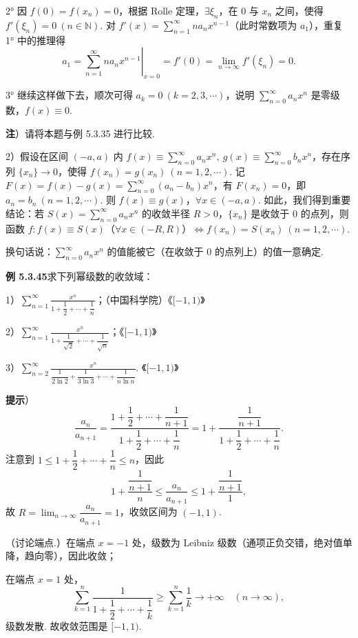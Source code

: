 \documentclass[UTF8,12pt,a4paper,fontset=fandol]{ctexart}
\begin{document}
2° 因 $f(0)=f(x_n)=0$，根据 Rolle 定理，$\exists\xi_n$，在 0 与 $x_n$ 之间，使得 $f'(\xi_n)=0\ (n\in\mathbb N)$. 对 $f'(x)=\displaystyle\sum_{n=1}^{\infty}na_nx^{n-1}$（此时常数项为 $a_1$），重复 1° 中的推理得
\[
  a_1=\left.\sum_{n=1}^{\infty}na_nx^{n-1}\right|_{x=0}
  =f'(0)=\lim_{n\to\infty}f'(\xi_n)=0.
\]

3° 继续这样做下去，顺次可得 $a_k=0\ (k=2,3,\cdots)$，说明 $\displaystyle\sum_{n=0}^{\infty}a_nx^n$ 是零级数，$f(x)\equiv0$.

\noindent\textbf{注}）请将本题与例 5.3.35 进行比较.

2）假设在区间 $(-a,a)$ 内 $f(x)\equiv\displaystyle\sum_{n=0}^{\infty}a_nx^n,\ g(x)\equiv\displaystyle\sum_{n=0}^{\infty}b_nx^n$，存在序列 $\{x_n\}\to0$，使得 $f(x_n)=g(x_n)\ (n=1,2,\cdots)$. 记 $F(x)=f(x)-g(x)=\displaystyle\sum_{n=0}^{\infty}(a_n-b_n)x^n$，有 $F(x_n)=0$，即 $a_n=b_n\ (n=1,2,\cdots)$. 则 $f(x)\equiv g(x)$，$\forall x\in(-a,a)$. 如此，我们得到重要结论：若 $S(x)=\displaystyle\sum_{n=0}^{\infty}a_nx^n$ 的收敛半径 $R>0$，$\{x_n\}$ 是收敛于 0 的点列，则函数 $f:f(x)\equiv S(x)$（$\forall x\in(-R,R)$）$\Leftrightarrow f(x_n)=S(x_n)\ (n=1,2,\cdots)$.

换句话说：$\displaystyle\sum_{n=0}^{\infty}a_nx^n$ 的值能被它（在收敛于 0 的点列上）的值一意确定.

\noindent\textbf{例 5.3.45}\quad 求下列幂级数的收敛域：

1）$\displaystyle\sum_{n=1}^{\infty}
\frac{x^n}{1+\dfrac12+\cdots+\dfrac1n}$；（中国科学院）\hfill 《$[-1,1)$》

2）$\displaystyle\sum_{n=1}^{\infty}
\frac{x^n}{1+\dfrac1{\sqrt2}+\cdots+\dfrac1{\sqrt n}}$；\hfill 《$[-1,1)$》

3）$\displaystyle\sum_{n=2}^{\infty}
\frac{x^n}{\dfrac1{2\ln2}+\dfrac1{3\ln3}+\cdots+\dfrac1{n\ln n}}$. \hfill 《$[-1,1)$》

\noindent\textbf{提示}）
\[
  \frac{a_n}{a_{n+1}}
  =\frac{1+\dfrac12+\cdots+\dfrac1{n+1}}
         {1+\dfrac12+\cdots+\dfrac1n}
  =1+\frac{\dfrac1{n+1}}{1+\dfrac12+\cdots+\dfrac1n}.
\]
注意到 $1\le1+\dfrac12+\cdots+\dfrac1n\le n$，因此
\[
  1+\frac{\dfrac1{n+1}}n
  \le\frac{a_n}{a_{n+1}}
  \le1+\frac{\dfrac1{n+1}}1,
\]
故 $R=\displaystyle\lim_{n\to\infty}\dfrac{a_n}{a_{n+1}}=1$，收敛区间为 $(-1,1)$.

（讨论端点.）在端点 $x=-1$ 处，级数为 Leibniz 级数（通项正负交错，绝对值单降，趋向零），因此收敛；

在端点 $x=1$ 处，
\[
  \sum_{k=1}^n\frac1{1+\dfrac12+\cdots+\dfrac1k}
  \ge\sum_{k=1}^n\frac1k\to+\infty\quad(n\to\infty),
\]
级数发散. 故收敛范围是 $[-1,1)$.
\end{document}
